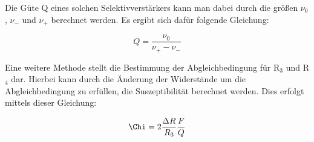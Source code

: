 Die Güte Q eines solchen Selektivverstärkers kann man dabei durch die größen $\nu_0$, $\nu_-$ und $\nu_+$ berechnet werden.
Es ergibt sich dafür folgende Gleichung:

\begin{equation}
  Q = \frac{\nu_0}{\nu_+ - \nu_-}
\end{equation}

Eine weitere Methode stellt die Bestimmung der Abgleichbedingung für R$_3$ und R$_4$ dar.
Hierbei kann durch die Änderung der Widerstände um die Abgleichbedingung zu erfüllen, die Suszeptibilität berechnet werden.
Dies erfolgt mittels dieser Gleichung:

\begin{equation}
  \Chi = 2 \frac{\Delta R}{R_3} \frac{F}{Q}
\end{equation}
